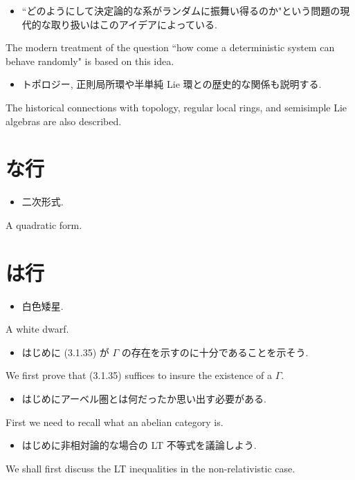 \documentclass[openany, a4paper, oneside]{jsbook}
\begin{document}
\begin{itemize}
\item ``どのようにして決定論的な系がランダムに振舞い得るのか"という問題の現代的な取り扱いはこのアイデアによっている. \cite{OmriSarig1}
\end{itemize}
The modern treatment of the question ``how come a deterministic system can behave randomly" is based on this idea.

\begin{itemize}
\item トポロジー, 正則局所環や半単純 Lie 環との歴史的な関係も説明する. \cite{CharlesWeibel1}
\end{itemize}
The historical connections with topology, regular local rings, and semisimple Lie algebras are also described.
\section{な行}

\begin{itemize}
\item 二次形式.
\end{itemize}
A quadratic form.
\section{は行}

\begin{itemize}
\item 白色矮星. \cite{LiebSeiringer1}
\end{itemize}
A white dwarf.

\begin{itemize}
\item はじめに (3.1.35) が $\Gamma$ の存在を示すのに十分であることを示そう. \cite{LiebSeiringer1}
\end{itemize}
We first prove that (3.1.35) suffices to insure the existence of a $\Gamma$.

\begin{itemize}
\item はじめにアーベル圏とは何だったか思い出す必要がある. \cite{CharlesWeibel1}
\end{itemize}
First we need to recall what an abelian category is.

\begin{itemize}
\item はじめに非相対論的な場合の LT 不等式を議論しよう. \cite{LiebSeiringer1}
\end{itemize}
We shall first discuss the LT inequalities in the non-relativistic case.
\end{document}
